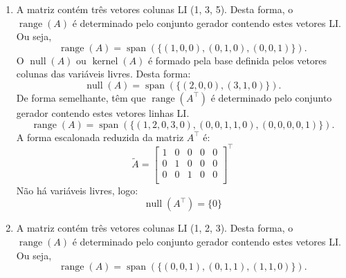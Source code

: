 \begin{resolution}
  \vspace{-24pt}
  \begin{enumerate}[label=\alph*)]
    \item A matriz contém três vetores colunas LI (1, 3, 5). Desta forma, o $\operatorname{range}(A)$ é determinado pelo conjunto gerador contendo estes vetores LI. Ou seja,
          \begin{equation}
            \operatorname{range}(A) = \operatorname{span} (\{(1, 0, 0), (0, 1, 0), (0, 0, 1)\}).
          \end{equation}
          O $\operatorname{null}(A)$ ou $\operatorname{kernel}(A)$ é formado pela base definida pelos vetores colunas das variáveis livres. Desta forma:
          \begin{equation}
            \operatorname{null}(A) = \operatorname{span} (\{(2, 0, 0), (3, 1, 0)\}).
          \end{equation}
          De forma semelhante, têm que $\operatorname{range}(A^{\top})$ é determinado pelo conjunto gerador contendo estes vetores linhas LI.
          \begin{equation}
            \operatorname{range}(A) = \operatorname{span} (\{(1, 2, 0, 3, 0), (0, 0, 1, 1, 0), (0, 0, 0, 0, 1)\}).
          \end{equation}
          A forma escalonada reduzida da matriz $A^{\top}$ é:
          \begin{equation}
            \tilde A =\begin{bmatrix}
              1 & 0 & 0 & 0 & 0 \\
              0 & 1 & 0 & 0 & 0 \\
              0 & 0 & 1 & 0 & 0 \\
            \end{bmatrix} ^{\top}
          \end{equation}
          Não há variáveis livres, logo:
          \begin{equation}
            \operatorname{null}(A^{\top}) = \{0\}
          \end{equation}
    \item A matriz contém três vetores colunas LI (1, 2, 3). Desta forma, o $\operatorname{range}(A)$ é determinado pelo conjunto gerador contendo estes vetores LI. Ou seja,
          \begin{equation}
            \operatorname{range}(A) = \operatorname{span} (\{(0, 0, 1), (0, 1, 1), (1, 1, 0)\}).

\end{equation}
\end{enumerate}
\end{resolution}
